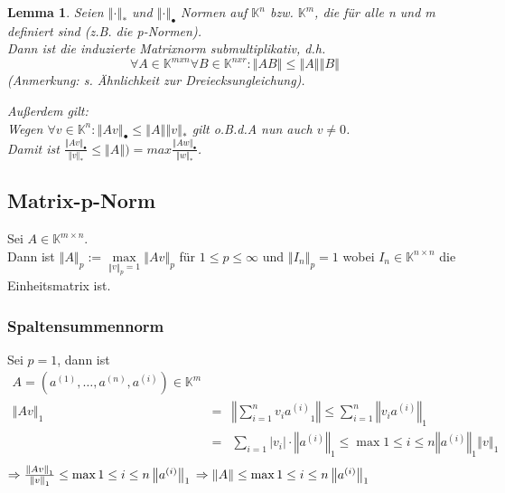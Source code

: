 \documentclass[a4paper,10pt]{article}
\newcommand{\norm}[1]{ \left\Vert #1 \right\Vert }
\newtheorem[L]{satz}{Satz}[section]
\newtheorem{lemma}{Lemma}[section]
\newtheorem[S]{beweis}{Beweis}
\newtheorem[S]{beh}{Behauptung}
\begin{document}
\bigskip

\begin{lemma}
Seien $\norm{\cdot}_*$ und $\norm{\cdot}_\bullet$ Normen auf $\mathbb{K}^n$ bzw. $\mathbb{K}^m$, die für alle n und m definiert sind (z.B. die p-Normen).\\
Dann ist die induzierte Matrixnorm submultiplikativ, d.h. 
$$\forall A \in \mathbb{K}^{m x n} \forall B \in \mathbb{K}^{n x r} :
\norm{AB} \leq \norm{A} \norm{B}$$
(Anmerkung: s. Ähnlichkeit zur Dreiecksungleichung).

\bigskip

Außerdem gilt:\\
Wegen $\forall v \in \mathbb{K}^n: \norm{Av}_\bullet \leq \norm{A} \norm{v}_*$ gilt o.B.d.A nun auch $ v \neq 0 $.\\
Damit ist $\frac{\norm{Av}_\bullet}{\norm{v}_*} \leq \norm{A}) = max \frac{\norm{Aw}_\bullet }{\norm{w}_*}$.

\end{lemma}

\newpage

\subsection{Matrix-p-Norm}
Sei $A \in \mathbb{K}^{m \times n}$.\\
Dann ist $\norm{A}_p := \max\limits_{\norm{v}_p = 1} \norm{Av}_p$ für $ 1 \leq p \leq \infty$ und $\norm{I_n}_p = 1$ wobei $I_n \in \mathbb{K}^{n \times n}$ die Einheitsmatrix ist.\\

\subsubsection{Spaltensummennorm}
  Sei $p = 1$, dann ist 
  \begin{eqnarray*}
  A = (a^{(1)}, \ldots, a^{(n)}, a^{(i)}) \in \mathbb{K}^m \\
  \norm{Av}_1 &=& \norm{\sum\limits_{i = 1}^n {v_i a^{(i)}}_1} \leq \sum\limits_{i = 1}^n \norm{v_i a^{(i)}}_1\\
    &=& \sum\limits_{i = 1} |v_i| \cdot \norm{a^{(i)}}_1 \leq \max\limits{1 \leq i\leq n} \norm{a^{(i)}}_1 \norm{v}_1\\
  \end{eqnarray*}
  $\Rightarrow \frac{\norm{Av}_1}{\norm{v}_1} \leq \max\limits{1 \leq i\leq n} \norm{a^{(i)}}_1\\
  \Rightarrow \norm{A} \leq \max\limits{1 \leq i\leq n} \norm{a^{(i)}}_1$
\end{document}
